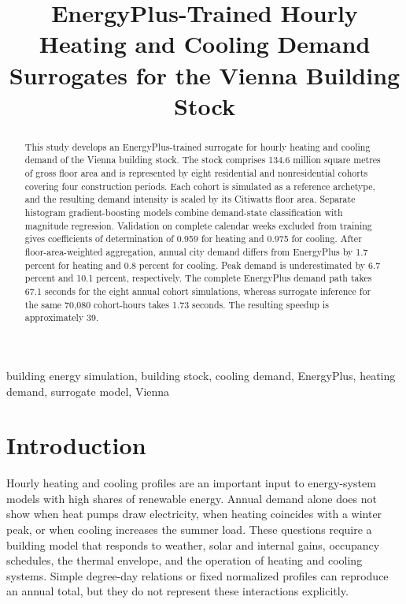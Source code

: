 \documentclass[conference]{IEEEtran}
\begin{document}
\title{EnergyPlus-Trained Hourly Heating and Cooling Demand Surrogates for the Vienna Building Stock}

\author{
}

\maketitle

\begin{abstract}
This study develops an EnergyPlus-trained surrogate for hourly heating and
cooling demand of the Vienna building stock. The stock comprises 134.6 million
square metres of gross floor area and is represented by eight residential and
nonresidential cohorts covering four construction periods. Each cohort is
simulated as a reference archetype, and the resulting demand intensity is
scaled by its Citiwatts floor area. Separate histogram gradient-boosting
models combine demand-state classification with magnitude regression.
Validation on complete calendar weeks excluded from training gives
coefficients of determination of 0.959 for heating and 0.975 for cooling.
After floor-area-weighted aggregation, annual city demand differs from
EnergyPlus by 1.7 percent for heating and 0.8 percent for cooling. Peak demand
is underestimated by 6.7 percent and 10.1 percent, respectively. The complete
EnergyPlus demand path takes 67.1 seconds for the eight annual cohort
simulations, whereas surrogate inference for the same 70,080 cohort-hours
takes 1.73 seconds. The resulting speedup is approximately 39.
\end{abstract}

\begin{IEEEkeywords}
building energy simulation, building stock, cooling demand, EnergyPlus,
heating demand, surrogate model, Vienna
\end{IEEEkeywords}

\section{Introduction}

Hourly heating and cooling profiles are an important input to energy-system
models with high shares of renewable energy. Annual demand alone does not show
when heat pumps draw electricity, when heating coincides with a winter peak,
or when cooling increases the summer load. These questions require a building
model that responds to weather, solar and internal gains, occupancy schedules,
the thermal envelope, and the operation of heating and cooling systems. Simple
degree-day relations or fixed normalized profiles can reproduce an annual
total, but they do not represent these interactions explicitly.
\end{document}
